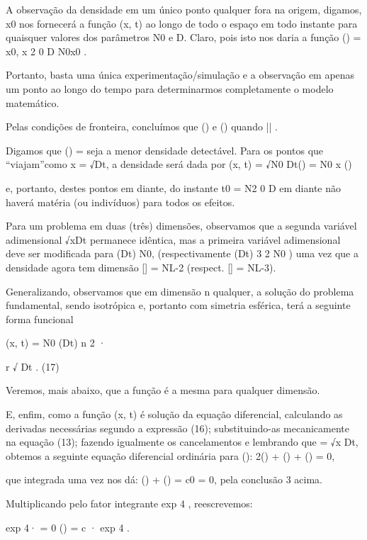\Rightarrow A observação da densidade em um único ponto qualquer fora na origem, digamos, x0 nos fornecerá a função \rho (x, t) ao longo de todo o espaço em todo instante para quaisquer valores dos parâmetros N0 e D. Claro, pois isto nos daria a função
\Phi(\xi) = \rho 
x0,
x
2
0
D
\xi
N0x0
.

Portanto, basta uma única experimentação/simulação e a observação em apenas um ponto ao longo do tempo para determinarmos completamente o modelo matemático.

\Rightarrow Pelas condições de fronteira, concluímos que \Phi(\xi)  e (\xi)  quando |\xi| \to  \infty.

\Rightarrow Digamos que \Phi() = \delta seja a menor densidade detectável. Para os pontos que “viajam”como x = √Dt, a densidade será dada por \rho (x, t) = √N0
Dt\Phi() = N0
x
\Phi()

e, portanto, destes pontos em diante, do instante t0 =
N2
0
D
em diante não haverá matéria (ou indivíduos) para todos os efeitos.

\Rightarrow Para um problema em duas (três) dimensões, observamos que a segunda variável adimensional √xDt permanece idêntica, mas a primeira variável adimensional deve ser modificada para \rho (Dt) N0, (respectivamente \rho (Dt)
3
2
N0
) uma vez que a densidade agora tem dimensão [\rho ] = NL-2 (respect. [\rho ] = NL-3).

Generalizando, observamos que em dimensão n qualquer, a solução do problema fundamental, sendo isotrópica e, portanto com simetria esférica, terá a seguinte forma funcional

\rho (x, t) = N0
(Dt)
n
2
· \Phin

r
√
Dt
. (17)

Veremos, mais abaixo, que a função \Phin é a mesma para qualquer dimensão.

\Rightarrow E, enfim, como a função \rho (x, t) é solução da equação diferencial, calculando as derivadas necessárias segundo a expressão (16); substituindo-as mecanicamente na equação (13); fazendo igualmente os cancelamentos e lembrando que \xi = √x Dt, obtemos a seguinte equação diferencial ordinária para \Phi(\xi):
2(\xi) + \xi{}
(\xi) + \Phi(\xi) = 0,

que integrada uma vez nos dá: (\xi) +  \Phi(\xi) = c0 = 0, pela conclusão 3 acima.

Multiplicando pelo fator integrante exp 
4
, reescrevemos:


exp
4· 
= 0 \Rightarrow \Phi(\xi) = c · exp 
4
.

